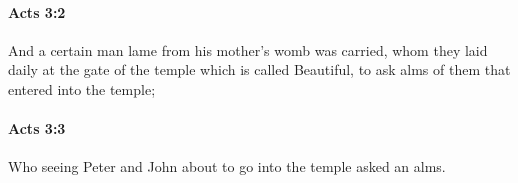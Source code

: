 		\paragraph{Acts 3:2} %
			\label{ACTS-3-2}

			And a certain man lame from his mother's womb was carried, whom they laid daily at the gate of the temple which is called Beautiful, to ask alms of them that entered into the temple;

			\begin{framed}
			\scriptsize
				\begin{compactdesc}
					\item[SBLG] 
				\end{compactdesc}
			\end{framed}

		\paragraph{Acts 3:3} %
			\label{ACTS-3-3}

			Who seeing Peter and John about to go into the temple asked an alms.


